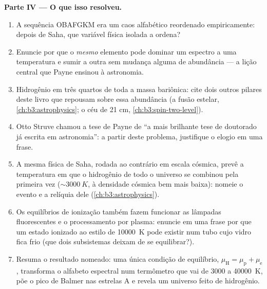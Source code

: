 \begin{problem}
\medskip\noindent\textbf{Parte IV --- O que isso resolveu.}
\begin{enumerate}[resume]
  \item A sequência OBAFGKM era um caos alfabético reordenado
        empiricamente: depois de Saha, que variável física
        isolada a ordena?
  \item Enuncie por que o \emph{mesmo} elemento pode dominar um
        espectro a uma temperatura e sumir a outra sem
        mudança alguma de abundância --- a lição central que Payne
        ensinou à astronomia.
  \item Hidrogênio em três quartos de toda a massa bariônica: cite dois
        outros pilares deste livro que repousam sobre essa abundância
        (a fusão estelar, \cref{ch:b3:astrophysics}; o céu de 21 cm,
        \cref{ch:b3:spin-two-level}).
  \item Otto Struve chamou a tese de Payne de ``a mais brilhante
        tese de doutorado já escrita em astronomia'': a partir deste
        problema, justifique o elogio em uma frase.
  \item A mesma física de Saha, rodada ao contrário em escala cósmica,
        prevê a temperatura em que o hidrogênio de todo o universo se
        combinou pela primeira vez ($\sim\qty{3000}{K}$, à densidade
        cósmica bem mais baixa): nomeie o evento e a relíquia dele
        (\cref{ch:b3:astrophysics}).
  \item Os equilíbrios de ionização também fazem funcionar as lâmpadas
        fluorescentes e o processamento por plasma: enuncie em uma frase
        por que um estado ionizado ao estilo de \qty{10000}{K} pode
        existir num tubo cujo vidro fica frio (que dois subsistemas
        deixam de se equilibrar?).
  \item Resuma o resultado nomeado: uma única condição de equilíbrio,
        $\mu_{\text{H}} = \mu_{\text{p}} + \mu_{\text{e}}$, transforma
        o alfabeto espectral num termômetro que vai de
        $3000$ a \qty{40000}{K}, põe o pico de Balmer nas estrelas
        A e revela um universo feito de hidrogênio.
\end{enumerate}
\end{problem}
